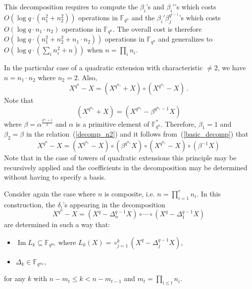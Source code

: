 \documentclass{sig-alternate}
\newcommand{\ff}[1]{\mathbb{F}_{#1}}
\newcommand{\qq}{q}
\newcommand{\nn}{n}
\newcommand{\qn}{{\qq^\nn}}
\newcommand{\extf}{\ff{\qn}}
\DeclareMathOperator{\Ima}{Im}
\newcommand{\bigO}{O}
\begin{document}
 This decomposition requires to compute the $\beta_i$'s and $\beta_i'$'s which costs $\bigO(\log q \cdot (n_1^2 +n_2^2))$ operations in $\extf$ and the $\beta_i'  \beta_j^{\qq^{i-1}}$'s 
 which costs $\bigO(\log q \cdot n_1 \cdot n_2)$ operations in $\extf$. The overall cost is therefore $\bigO(\log q \cdot (n_1^2 +n_2^2 +n_1 \cdot n_2 ))$ operations in $\extf$ and generalizes to $O(\log q \cdot (\sum_i n_i^2 + n))$ when $n=\prod_i n_i$.

\medskip

 In the particular case of a quadratic extension with characteristic $\ne 2$, we have $n=n_1 \cdot n_2$ where $n_2=2$. Also,
$$X^{\qq^\nn}-X=(X^{\qq^{n_1}}+X)  \circ (X^{\qq^{n_1}}-X)  \,.$$
Note that 
$$(X^{\qq^{n_1}}+X)=(X^{\qq^{n_1}} - \beta^{\qq^{n_1}-1} X)$$
 where $\beta=\alpha^{\frac{\qq^{n_1}+1}{2}}$ and $\alpha$ is a primitive element of $\extf^\ast$.
Therefore, $\beta_1=1$ and $\beta_2=\beta$ in the relation~(\ref{decomp_n2}) and it follows from~(\ref{basic_decomp}) that
$$X^{\qq^\nn}-X=(X^{\qq^{n_1}}-X) \circ  (\beta^{\qq^{n_1}} X) \circ (X^{\qq^{n_1}}-X) \circ  (\beta^{-1} X) $$
Note that in the case of towers of quadratic extensions this principle may be recursively applied and the coefficients in the decomposition may be determined without having to specify a basis.

\medskip
 
\medskip 
 
 Consider again the case where $\nn$ is composite, i.e. $n=\prod_{i=1}^r n_i$. In this construction, the $\delta_i$'s appearing in the decomposition
$$X^{\qq^\nn}-X=(X^\qq-\Delta_n^{\qq-1} X) \circ  \cdots \circ (X^\qq-\Delta_1^{\qq-1} X) $$
are determined in such a way that:
\begin{itemize}
\item $\Ima L_k \subseteq \mathbb{F}_{\qq^{m_t}}$ where $L_k(X)=\circ_{j=1}^k (X^q-\Delta_j^{q-1} X)$,
\item $\Delta_{k} \in \mathbb{F}_{\qq^{m_t}}$,
\end{itemize}
for any $k$ with $n-m_{t} \le k < n-m_{t-1}$ and $m_t=\prod_{i \le t} n_i$.

\medskip
\end{document}
